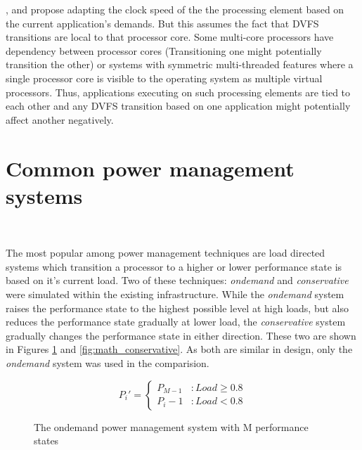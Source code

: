 \cite{AnIntraTask}, \cite{LiveRuntime} and \cite{Phaseaware} propose adapting the clock speed of the the processing element based
on the current application's demands. But this assumes the fact that DVFS transitions
are local to that processor core. Some multi-core processors have dependency between 
processor cores (Transitioning one might potentially transition the other) or systems with 
symmetric multi-threaded features where a single processor
core is visible to the operating system as multiple virtual processors. Thus, applications
executing on such processing elements are tied to each other and any DVFS
transition based on one application might potentially affect another negatively. 

\section{Common power management systems}~\label{sec:common_pow}

The most popular among power management techniques are load directed systems
which transition a processor to a higher or lower performance state is based on it's current load. Two
of these techniques: \textit{ondemand}\cite{OnDemand} and \textit{conservative} 
were simulated within the existing infrastructure. While the \textit{ondemand}
system raises the performance state to the highest possible level at high loads, but
also reduces the performance state gradually at lower load, the \textit{conservative}
system gradually changes the performance state in either direction. These two are 
shown in Figures \ref{fig:math_ondemand} and \ref{fig:math_conservative}. As both 
are similar in design, only the \textit{ondemand} system was used in the comparision.

\begin{figure}[h!]
\centering
\begin{equation*}
    P_{i}' = \left\{ \begin{array}{lr} 
                   P_{M-1} & : Load \geq 0.8 \\
		   P_{i}-1 & : Load < 0.8
                  \end{array} \right.
\end{equation*}
\caption{The ondemand power management system with M performance states}
\label{fig:math_ondemand}
\end{figure}

